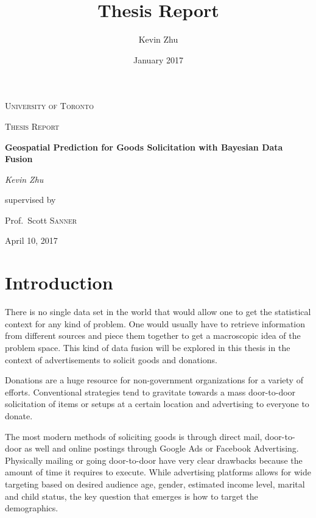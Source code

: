 \documentclass[12pt]{article}
\title{Thesis Report}
\date{January 2017}
\author{Kevin Zhu}
\begin{document}
\begin{titlepage}
   \centering
   {\scshape\LARGE University of Toronto \par}
   \vspace{1cm}
   {\scshape\Large Thesis Report\par}
   \vspace{1.5cm}
   {\huge\bfseries Geospatial Prediction for Goods Solicitation with Bayesian Data Fusion\par}
   \vspace{2cm}
   {\Large\itshape Kevin Zhu\par}
   \vfill
   supervised by\par
   Prof.~Scott \textsc{Sanner}
   \vfill
   {\large April 10, 2017\par}
\end{titlepage}

\newpage
\tableofcontents
\newpage

\section{Introduction}

There is no single data set in the world that would allow one to get the statistical context for any kind of problem. One would usually have to retrieve information from different sources and piece them together to get a macroscopic idea of the problem space. This kind of data fusion will be explored in this thesis in the context of advertisements to solicit goods and donations. 

Donations are a huge resource for non-government organizations for a variety of efforts. %
Conventional strategies tend to gravitate towards a mass door-to-door solicitation of items or setups at a certain location and advertising to everyone to donate. %

The most modern methods of soliciting goods is through direct mail, door-to-door as well and online postings through Google Ads or Facebook Advertising. Physically mailing or going door-to-door have very clear drawbacks because the amount of time it requires to execute. While advertising platforms allows for wide targeting based on desired audience age, gender, estimated income level, marital and child status, the key question that emerges is how to target the demographics. 
\end{document}
